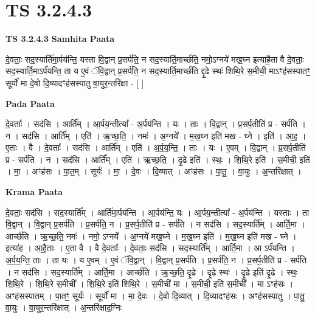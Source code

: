 \documentclass[17pt]{extarticle}
\begin{document}
\section{ TS 3.2.4.3 }

\textbf{TS 3.2.4.3 } \newline
\textbf{Samhita Paata} \newline

दे॒वताः॒ सद॒स्यार्ति॑मा॒र्पय॑न्ति॒ यस्ता वि॒द्वान् प्र॒सर्प॑ति॒ न सद॒स्यार्ति॒मार्च्छ॑ति॒ नमो॒ऽग्नये॑ मख॒घ्न इत्या॑है॒ता वै दे॒वताः॒ सद॒स्यार्ति॒माऽर्प॑यन्ति॒ ता य ए॒वं ॅवि॒द्वान् प्र॒सर्प॑ति॒ न सद॒स्यार्ति॒मार्च्छ॑ति द्दृ॒ढे स्थः॑ शिथि॒रे स॒मीची॒ माऽꣳह॑सस्पातꣳ॒॒ सूर्यो॑ मा दे॒वो दि॒व्यादꣳह॑सस्पातु वा॒युर॒न्तरि॑क्षा - [  ] \newline

\textbf{Pada Paata} \newline

दे॒वताः᳚ । सद॑सि । आर्ति᳚म् । आ॒र्पय॒न्तीत्या᳚ - अ॒र्पय॑न्ति । यः । ताः । वि॒द्वान् । प्र॒सर्प॒तीति॑ प्र - सर्प॑ति । न । सद॑सि । आर्ति᳚म् । एति॑ । ऋ॒च्छ॒ति॒ । नमः॑ । अ॒ग्नये᳚ । म॒ख॒घ्न इति॑ मख - घ्ने । इति॑ । आ॒ह॒ । ए॒ताः । वै । दे॒वताः᳚ । सद॑सि । आर्ति᳚म् । एति॑ । अ॒र्प॒य॒न्ति॒ । ताः । यः । ए॒वम् । वि॒द्वान् । प्र॒सर्प॒तीति॑ प्र - सर्प॑ति । न । सद॑सि । आर्ति᳚म् । एति॑ । ऋ॒च्छ॒ति॒ । दृ॒ढे इति॑ । स्थः॒ । शि॒थि॒रे इति॑ । स॒मीची॒ इति॑ । मा॒ । अꣳह॑सः । पा॒त॒म् । सूर्यः॑ । मा॒ । दे॒वः । दि॒व्यात् । अꣳह॑सः । पा॒तु॒ । वा॒युः । अ॒न्तरि॑क्षात् ।  \newline


\textbf{Krama Paata} \newline

दे॒वताः॒ सद॑सि । सद॒स्यार्ति᳚म् । आर्ति॑मा॒र्पय॑न्ति । आ॒र्पय॑न्ति॒ यः । आ॒र्पय॒न्तीत्या᳚ - अ॒र्पय॑न्ति । यस्ताः । ता वि॒द्वान् । वि॒द्वान् प्र॒सर्प॑ति । प्र॒सर्प॑ति॒ न । प्र॒सर्प॒तीति॑ प्र - सर्प॑ति । न सद॑सि । सद॒स्यार्ति᳚म् । आर्ति॒मा । आर्च्छ॑ति । ऋ॒च्छ॒ति॒ नमः॑ । नमो॒ ऽग्नये᳚ । अ॒ग्नये॑ मख॒घ्ने । म॒ख॒घ्न इति॑ । म॒ख॒घ्न इति॑ मख - घ्ने । इत्या॑ह । आ॒है॒ताः । ए॒ता वै । वै दे॒वताः᳚ । दे॒वताः॒ सद॑सि । सद॒स्यार्ति᳚म् । आर्ति॒मा । आ ऽर्प॑यन्ति । अ॒र्प॒य॒न्ति॒ ताः । ता यः । य ए॒वम् । ए॒वं ॅवि॒द्वान् । वि॒द्वान् प्र॒सर्प॑ति । प्र॒सर्प॑ति॒ न । प्र॒सर्प॒तीति॑ प्र - सर्प॑ति । न सद॑सि । सद॒स्यार्ति᳚म् । आर्ति॒मा । आर्च्छ॑ति । ऋ॒च्छ॒ति॒ दृ॒ढे । दृ॒ढे स्थः॑ । दृ॒ढे इति॑ दृ॒ढे । स्थः॒ शि॒थि॒रे । शि॒थि॒रे स॒मीची᳚ । शि॒थि॒रे इति॑ शिथि॒रे । स॒मीची॑ मा । स॒मीची॒ इति॑ स॒मीची᳚ । मा ऽꣳह॑सः । अꣳह॑सस्पातम् । पा॒तꣳ॒॒ सूर्यः॑ । सूर्यो॑ मा । मा॒ दे॒वः । दे॒वो दि॒व्यात् । दि॒व्यादꣳह॑सः । अꣳह॑सस्पातु । पा॒तु॒ वा॒युः । वा॒युर॒न्तरि॑क्षात् । अ॒न्तरि॑क्षाद॒ग्निः \newline
\end{document}
